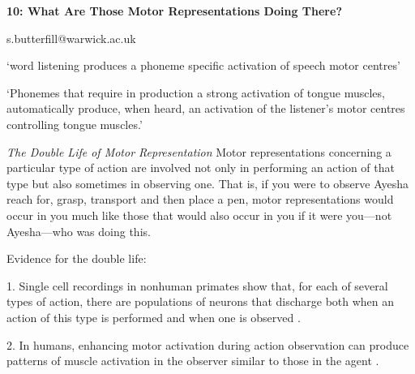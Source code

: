 \documentclass[12pt]{extarticle}
\date{}
\makeatletter
\def \ititle {Philosophical Psychology}
\def \iemail{s.butterfill@warwick.ac.uk}
\makeatother
\begin{document}
\begin{multicols*}{3}

\setlength\footnotesep{1em}









\def \ititle {10: What Are Those Motor Representations Doing There?}

\begin{center}

{\Large

\textbf{\ititle}

}



\iemail %

\end{center}



‘word listening produces a phoneme specific activation of speech motor centres’ \citep{Fadiga:2002kl}
            
‘Phonemes that require in production a strong activation of tongue muscles, automatically produce, when heard, an activation of the listener's motor centres controlling tongue muscles.’ \citep{Fadiga:2002kl}

\emph{The Double Life of Motor Representation}
Motor representations concerning a particular type of action are involved not only in performing an action of that type but also sometimes in observing one.   That is, if you were to observe Ayesha reach for, grasp, transport and then place a pen, motor representations would occur in you much like those that would also occur in you if it were you---not Ayesha---who was doing this.  

Evidence for the double life:

1. Single cell recordings in nonhuman primates show that, for each of several types of action, there are populations of neurons that discharge both when an action of this type is performed and when one is observed \citep{pellegrino:1992_understanding, gallese:1996_action,Fogassi:2005nf}.

2. In humans, enhancing motor activation during action observation can produce patterns of muscle activation in the observer similar to those in the agent  \citep{fadiga:1995_motor}.  


\end{multicols*}
\end{document}
